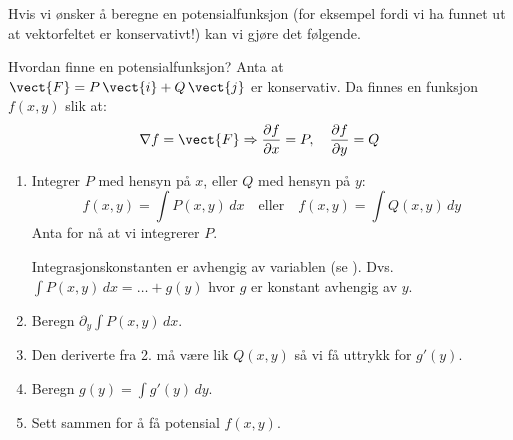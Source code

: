 Hvis vi ønsker å beregne en potensialfunksjon (for eksempel fordi vi ha funnet ut at vektorfeltet er konservativt!) kan vi gjøre det følgende.

\begin{oppsum}{Hvordan finne en potensialfunksjon?}
Anta at \( \vect{F} = P\, \vect{i} + Q\, \vect{j} \) er konservativ. Da finnes en funksjon \( f(x, y) \) slik at:
\[
\nabla f = \vect{F} \Rightarrow \frac{\partial f}{\partial x} = P,\quad \frac{\partial f}{\partial y} = Q
\]
\begin{enumerate}
\item[1.] Integrer \( P \) med hensyn på \( x \), eller \( Q \) med hensyn på \( y \):
\[
f(x, y) = \int P(x, y)\, dx \quad \text{eller} \quad f(x, y) = \int Q(x, y)\, dy
\]
Anta for nå at vi integrerer $P$. 

\begin{minipage}{.9\columnwidth}
\begin{rem}{}
     Integrasjonskonstanten er  avhengig av variablen (se ). Dvs. $\int P(x, y)\, dx = \ldots + g(y)$ hvor $g$ er konstant avhengig av $y$.
\end{rem}
\end{minipage}
\item[2.] Beregn $\partial_y \int P(x, y)\, dx$.
\item[3.] Den deriverte fra 2. må være lik $Q(x,y)$ så vi få uttrykk for $g'(y)$. 
\item[4.] Beregn $g(y)= \int g'(y)\, dy$.
\item[5.] Sett sammen for å få potensial $f(x,y)$.
\end{enumerate}
\end{oppsum}

